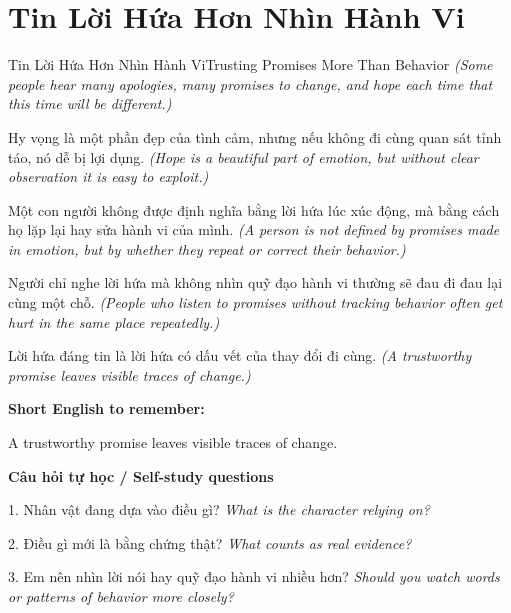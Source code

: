 \section{Tin Lời Hứa Hơn Nhìn Hành Vi}
\begin{truyen}{Tin Lời Hứa Hơn Nhìn Hành Vi}{Trusting Promises More Than Behavior}
\textit{(Some people hear many apologies, many promises to change, and hope each time that this time will be different.)}

Hy vọng là một phần đẹp của tình cảm, nhưng nếu không đi cùng quan sát tỉnh táo, nó dễ bị lợi dụng.
\textit{(Hope is a beautiful part of emotion, but without clear observation it is easy to exploit.)}

Một con người không được định nghĩa bằng lời hứa lúc xúc động, mà bằng cách họ lặp lại hay sửa hành vi của mình.
\textit{(A person is not defined by promises made in emotion, but by whether they repeat or correct their behavior.)}

Người chỉ nghe lời hứa mà không nhìn quỹ đạo hành vi thường sẽ đau đi đau lại cùng một chỗ.
\textit{(People who listen to promises without tracking behavior often get hurt in the same place repeatedly.)}

\end{truyen}

\begin{baihoc}
Lời hứa đáng tin là lời hứa có dấu vết của thay đổi đi cùng.
\textit{(A trustworthy promise leaves visible traces of change.)}
\end{baihoc}

\begin{ghinhoanh}
\textbf{Short English to remember:}

A trustworthy promise leaves visible traces of change.

\end{ghinhoanh}

\begin{tuhocnhanh}
\textbf{Câu hỏi tự học / Self-study questions}

1. Nhân vật đang dựa vào điều gì? \textit{What is the character relying on?}

2. Điều gì mới là bằng chứng thật? \textit{What counts as real evidence?}

3. Em nên nhìn lời nói hay quỹ đạo hành vi nhiều hơn? \textit{Should you watch words or patterns of behavior more closely?}
\end{tuhocnhanh}
\ngancach

